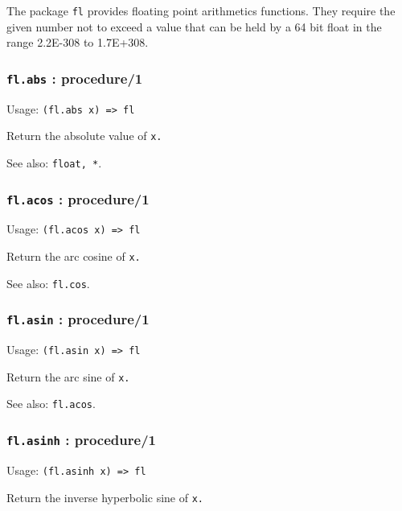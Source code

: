 \documentclass[
]{article}
\newcommand{\passthrough}[1]{#1}
\begin{document}
The package \passthrough{\lstinline!fl!} provides floating point
arithmetics functions. They require the given number not to exceed a
value that can be held by a 64 bit float in the range 2.2E-308 to
1.7E+308.

\hypertarget{fl.abs-procedure1}{%
\subsubsection{\texorpdfstring{\texttt{fl.abs} :
procedure/1}{fl.abs : procedure/1}}\label{fl.abs-procedure1}}

Usage: \passthrough{\lstinline!(fl.abs x) => fl!}

Return the absolute value of \passthrough{\lstinline!x.!}

See also: \passthrough{\lstinline!float, *!}.

\hypertarget{fl.acos-procedure1}{%
\subsubsection{\texorpdfstring{\texttt{fl.acos} :
procedure/1}{fl.acos : procedure/1}}\label{fl.acos-procedure1}}

Usage: \passthrough{\lstinline!(fl.acos x) => fl!}

Return the arc cosine of \passthrough{\lstinline!x.!}

See also: \passthrough{\lstinline!fl.cos!}.

\hypertarget{fl.asin-procedure1}{%
\subsubsection{\texorpdfstring{\texttt{fl.asin} :
procedure/1}{fl.asin : procedure/1}}\label{fl.asin-procedure1}}

Usage: \passthrough{\lstinline!(fl.asin x) => fl!}

Return the arc sine of \passthrough{\lstinline!x.!}

See also: \passthrough{\lstinline!fl.acos!}.

\hypertarget{fl.asinh-procedure1}{%
\subsubsection{\texorpdfstring{\texttt{fl.asinh} :
procedure/1}{fl.asinh : procedure/1}}\label{fl.asinh-procedure1}}

Usage: \passthrough{\lstinline!(fl.asinh x) => fl!}

Return the inverse hyperbolic sine of \passthrough{\lstinline!x.!}
\end{document}
